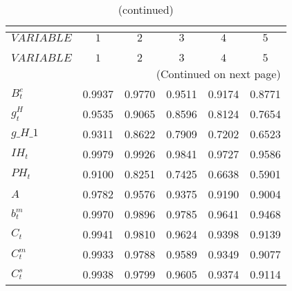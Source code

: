  
\begin{center}
\begin{longtable}{lccccc} 
\caption{AUTOCORRELATION OF SIMULATED VARIABLES}\\
 \label{Table:sim_autocorr_matrix}\\
\toprule 
$VARIABLE                   $	 & 	 $             1$	 & 	 $             2$	 & 	 $             3$	 & 	 $             4$	 & 	 $             5$\\
\midrule \endfirsthead 
\caption{(continued)}\\
 \toprule \\ 
$VARIABLE                   $	 & 	 $             1$	 & 	 $             2$	 & 	 $             3$	 & 	 $             4$	 & 	 $             5$\\
\midrule \endhead 
\midrule \multicolumn{6}{r}{(Continued on next page)} \\ \bottomrule \endfoot 
\bottomrule \endlastfoot 
$B^e_t                      $	 & 	        0.9937	 & 	        0.9770	 & 	        0.9511	 & 	        0.9174	 & 	        0.8771 \\ 
$g^H_t                      $	 & 	        0.9535	 & 	        0.9065	 & 	        0.8596	 & 	        0.8124	 & 	        0.7654 \\ 
$g\_H\_1                    $	 & 	        0.9311	 & 	        0.8622	 & 	        0.7909	 & 	        0.7202	 & 	        0.6523 \\ 
$IH_t                       $	 & 	        0.9979	 & 	        0.9926	 & 	        0.9841	 & 	        0.9727	 & 	        0.9586 \\ 
$PH_t                       $	 & 	        0.9100	 & 	        0.8251	 & 	        0.7425	 & 	        0.6638	 & 	        0.5901 \\ 
$ A                         $	 & 	        0.9782	 & 	        0.9576	 & 	        0.9375	 & 	        0.9190	 & 	        0.9004 \\ 
$ b^m_t                     $	 & 	        0.9970	 & 	        0.9896	 & 	        0.9785	 & 	        0.9641	 & 	        0.9468 \\ 
$ C_t                       $	 & 	        0.9941	 & 	        0.9810	 & 	        0.9624	 & 	        0.9398	 & 	        0.9139 \\ 
$ C^m_t                     $	 & 	        0.9933	 & 	        0.9788	 & 	        0.9589	 & 	        0.9349	 & 	        0.9077 \\ 
$ C^s_t                     $	 & 	        0.9938	 & 	        0.9799	 & 	        0.9605	 & 	        0.9374	 & 	        0.9114 \\ 

\end{longtable}
\end{center}
